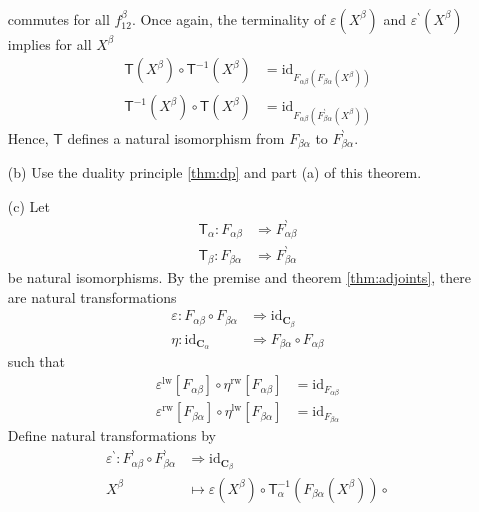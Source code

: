 \begin{prf}
\begin{enumerate}
\[\begin{tikzcd}[row sep=large, column sep=5.8em]
  &
\end{tikzcd}
\]
commutes for all $f_{12}^{\beta}$.
Once again, the terminality of $\varepsilon(X^{\beta})$ and $\varepsilon^{\backprime}(X^{\beta})$ implies for all $X^{\beta}$
\begin{align*}
  \mathsf{T}(X^{\beta})
  \circ
  \mathsf{T}^{-1}(X^{\beta})
  &=
  \mathrm{id}_{F_{\alpha\beta}(F_{\beta\alpha}(X^{\beta}))}
  \\
  \mathsf{T}^{-1}(X^{\beta})
  \circ
  \mathsf{T}(X^{\beta})
  &=
  \mathrm{id}_{F_{\alpha\beta}(F_{\beta\alpha}^{\backprime}(X^{\beta}))}
\end{align*}
Hence, $\mathsf{T}$ defines a natural isomorphism from $F_{\beta\alpha}$ to $F_{\beta\alpha}^{\backprime}$.
\item[(b)]
Use the duality principle \ref{thm:dp} and part (a) of this theorem.
\item[(c)]
Let
\begin{align*}
  \mathsf{T}_{\alpha}
  \colon
  F_{\alpha\beta}
  &\Rightarrow
  F_{\alpha\beta}^{\backprime}
  \\
  \mathsf{T}_{\beta}
  \colon
  F_{\beta\alpha}
  &\Rightarrow
  F_{\beta\alpha}^{\backprime}
\end{align*}
be natural isomorphisms.
By the premise and theorem \ref{thm:adjoints}, there are natural transformations
\begin{align*}
  \varepsilon
  \colon
  F_{\alpha\beta}
  \circ
  F_{\beta\alpha}
  &\Rightarrow
  \mathrm{id}_{\mathbf{C}_{\beta}}
  \\
  \eta
  \colon
  \mathrm{id}_{\mathbf{C}_{\alpha}}
  &\Rightarrow
  F_{\beta\alpha}
  \circ
  F_{\alpha\beta}
\end{align*}
such that
\begin{align*}
  \varepsilon^{\textrm{lw}}[F_{\alpha\beta}]
  \circ
  \eta^{\textrm{rw}}[F_{\alpha\beta}]
  &=
  \mathrm{id}_{F_{\alpha\beta}}
  \\
  \varepsilon^{\textrm{rw}}[F_{\beta\alpha}]
  \circ
  \eta^{\textrm{lw}}[F_{\beta\alpha}]
  &=
  \mathrm{id}_{F_{\beta\alpha}}
\end{align*}
Define natural transformations by
\begin{align*}
  \varepsilon^{\backprime}
  \colon
  F_{\alpha\beta}^{\backprime}
  \circ
  F_{\beta\alpha}^{\backprime}
  &\Rightarrow
  \mathrm{id}_{\mathbf{C}_{\beta}}
  \\
  X^{\beta}
  &\mapsto
  \varepsilon(X^{\beta})
  \circ
  \mathsf{T}_{\alpha}^{-1}
  \left(
    F_{\beta\alpha}(X^{\beta})
  \right)
  \circ

\end{align*}
\end{enumerate}
\end{prf}
